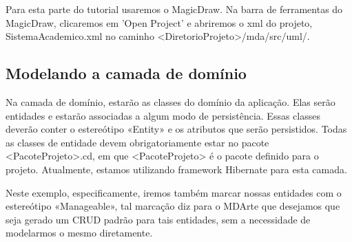 Para esta parte do tutorial usaremos o MagicDraw. Na barra de ferramentas do
MagicDraw, clicaremos em 'Open Project' e abriremos o xml do projeto,
SistemaAcademico.xml no caminho
<DiretorioProjeto>/mda/src/uml/.

\subsection{Modelando a camada de domínio}
Na camada de domínio, estarão as classes do domínio da aplicação. Elas serão entidades e
estarão associadas a algum modo de persistência. Essas classes deverão conter o estereótipo
«Entity» e os atributos que serão persistidos. Todas as classes de entidade devem obrigatoriamente
estar no pacote <PacoteProjeto>.cd, em que <PacoteProjeto> é o pacote definido para o projeto.
Atualmente, estamos utilizando framework Hibernate para esta camada. 

Neste exemplo, especificamente, iremos também marcar nossas entidades com o
estereótipo «Manageable», tal marcação diz para o MDArte que desejamos que seja
gerado um CRUD padrão para tais entidades, sem a necessidade de modelarmos o
mesmo diretamente.

